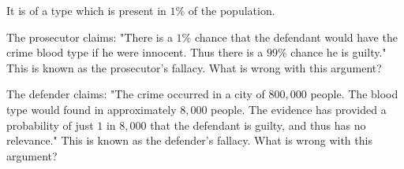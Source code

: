 \begin{exercise}
	It is of a type which is present in \(1\%\) of the population.
	\begin{exercise}
		\item
			The prosecutor claims: "There is a \(1\%\) chance that the defendant would have the crime blood type if he
			were innocent. Thus there is a \(99\%\) chance he is guilty." This is known as the prosecutor's fallacy.
			What is wrong with this argument?
		\item
			The defender claims: "The crime occurred in a city of \(800,000\) people. The blood type would found in
			approximately \(8,000\) people. The evidence has provided a probability of just \(1\) in \(8,000\) that the
			defendant is guilty, and thus has no relevance." This is known as the defender's fallacy. 
			What is wrong with this argument?
	\end{exercise}
\end{exercise}